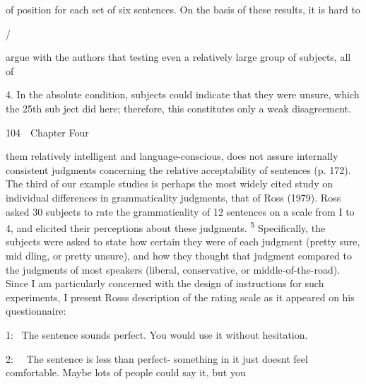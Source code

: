\begin{styleStandard}
of position for each set of six sentences. On the basis of these results, it is hard to
\end{styleStandard}


\begin{styleStandard}
/
\end{styleStandard}


\begin{styleStandard}
argue with the authors that {\textquotedbl}testing even a relatively large group of subjects, all of
\end{styleStandard}


\begin{styleStandard}
4. In the absolute condition, subjects could indicate that they were unsure, which the 25th sub\- ject did here; therefore, this constitutes only a weak disagreement.
\end{styleStandard}


\clearpage\setcounter{page}{1}\begin{styleStandard}
104\ \ Chapter Four
\end{styleStandard}


\begin{styleTextbody}
them relatively intelligent and language-conscious, does not assure internally consistent judgments concerning the relative acceptability of sentences{\textquotedbl} (p. 172). The third of our example studies is perhaps the most widely cited study on individual differences in grammaticality judgments, that of Ross (1979). Ross asked 30 subjects to rate the grammaticality of 12 sentences on a scale from I to 4, and elicited their perceptions about these judgments. \textsuperscript{5}\textsuperscript{ }Specifically, the subjects were asked to state how certain they were of each judgment (pretty sure, mid\- dling, or pretty unsure), and how they thought that judgment compared to the judgments of most speakers (liberal, conservative, or middle-of-the-road). Since I am particularly concerned with the design of instructions for such experiments, I present Ross{\textquotesingle}s description of the rating scale as it appeared on his questionnaire:
\end{styleTextbody}


\begin{styleTextbody}
1: \ The sentence sounds perfect. You would use it without hesitation.
\end{styleTextbody}


\begin{styleTextbody}
2: \ \ The sentence is less than perfect- something in it just doesn{\textquotesingle}t feel comfortable. Maybe lots of people could say it, but you
\end{styleTextbody}


